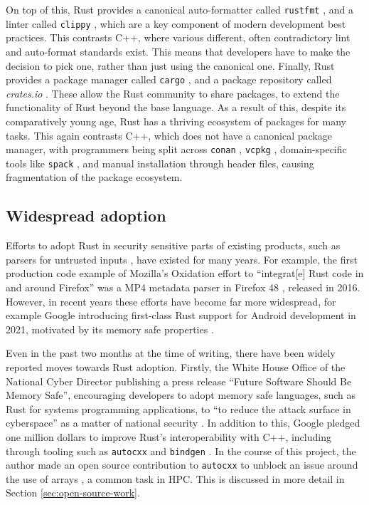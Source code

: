 On top of this, Rust provides a canonical auto-formatter called \texttt{rustfmt} \cite{RustlangRustfmt2024}, and a linter called \texttt{clippy} \cite{RustlangRustclippy2024}, which are a key component of modern development best practices. This contrasts C++, where various different, often contradictory lint and auto-format standards exist. This means that developers have to make the decision to pick one, rather than just using the canonical one. Finally, Rust provides a package manager called \texttt{cargo} \cite{RustlangCargo2024}, and a package repository called \textit{crates.io} \cite{CratesIoRust}. These allow the Rust community to share packages,
to extend the functionality of Rust beyond the base language. As a result of this, despite its comparatively young age, Rust has a thriving ecosystem of packages for many tasks. This again contrasts C++, which does not have a canonical package manager, with programmers being split across \texttt{conan} \cite{ConanioConan2024}, \texttt{vcpkg} \cite{MicrosoftVcpkg2024}, domain-specific tools like \texttt{spack} \cite{gamblin2015spack}, and manual installation through header files, causing fragmentation of the package ecosystem.

\subsection{Widespread adoption}
\label{ssec:rust-adoption}

Efforts to adopt Rust in security sensitive parts of existing products, such as parsers for untrusted inputs \cite{OxidationMozillaWiki}, have existed for many years. For example, the first production code example of Mozilla's Oxidation effort to ``integrat[e] Rust code in and around Firefox'' was a MP4 metadata parser in Firefox 48 \cite{OxidationMozillaWiki}, released in 2016. However, in recent years these efforts have become far more widespread, for example Google introducing first-class Rust support for Android development in 2021, motivated by its memory safe properties \cite{RustAndroidPlatform}.

Even in the past two months at the time of writing, there have been widely reported moves towards Rust adoption. Firstly, the White House Office of the National Cyber Director publishing a press release ``Future Software Should Be Memory Safe'', encouraging developers to adopt memory safe languages, such as Rust for systems programming applications, to ``to reduce the attack surface in cyberspace'' as a matter of national security \cite{PressReleaseFuture2024}. In addition to this, Google pledged one million dollars to improve Rust's interoperability with C++, including through tooling such as \texttt{autocxx} \cite{GoogleAutocxx2024} and \texttt{bindgen} \cite{RustlangRustbindgen2024}. In the course of this project, the author made an open source contribution to \texttt{autocxx} to unblock an issue around the use of arrays \cite{goodmanAddIntegrationTests}, a common task in \acrshort{HPC}. This is discussed in more detail in Section \ref{sec:open-source-work}.






